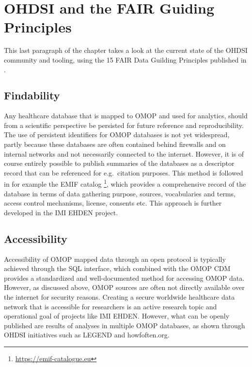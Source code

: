 \documentclass[11pt]{book}
\let\rmarkdownfootnote\footnote%
\def\footnote{\protect\rmarkdownfootnote}
\theoremstyle{definition}
\theoremstyle{definition}
\theoremstyle{definition}
\theoremstyle{remark}
\begin{document}
\hypertarget{ohdsi-and-the-fair-guiding-principles}{%
\section{OHDSI and the FAIR Guiding Principles}\label{ohdsi-and-the-fair-guiding-principles}}

This last paragraph of the chapter takes a look at the current state of the OHDSI community and tooling, using the 15 FAIR Data Guilding Principles published in \citet{wilkinson2016}.

\hypertarget{findability}{%
\subsection{Findability}\label{findability}}

Any healthcare database that is mapped to OMOP and used for analytics, should from a scientific perspective be persisted for future reference and reproducibility. The use of persistent identifiers for OMOP databases is not yet widespread, partly because these databases are often contained behind firewalls and on internal networks and not necessarily connected to the internet. However, it is of course entirely possible to publish summaries of the databases as a descriptor record that can be referenced for e.g.~citation purposes. This method is followed in for example the EMIF catalog \footnote{\url{https://emif-catalogue.eu}}, which provides a comprehensive record of the database in terms of data gathering purpose, sources, vocabularies and terms, access control mechanisms, license, consents etc. \citep{Oliveira2019} This approach is further developed in the IMI EHDEN project.

\hypertarget{accessibility}{%
\subsection{Accessibility}\label{accessibility}}

Accessibility of OMOP mapped data through an open protocol is typically achieved through the SQL interface, which combined with the OMOP CDM provides a standardized and well-documented method for accessing OMOP data. However, as discussed above, OMOP sources are often not directly available over the internet for security reasons. Creating a secure worldwide healthcare data network that is accessible for researchers is an active research topic and operational goal of projects like IMI EHDEN. However, what can be openly published are results of analyses in multiple OMOP databases, as shown through OHDSI initiatives such as LEGEND and howfoften.org.
\end{document}
